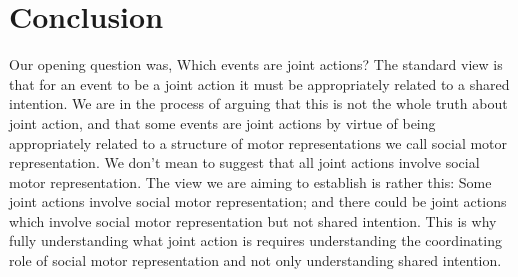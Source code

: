 \documentclass[12pt,\papersize]{extarticle}
\begin{document}
\section{Conclusion}
Our opening question was, Which events are joint actions?
The standard view is that for an event to be a joint action it must be appropriately related to a shared intention.
We are in the process of arguing that this is not the whole truth about joint action,
and that some events are joint actions by virtue of being appropriately related to a structure of motor representations we call social motor representation.
We don’t mean to suggest that all joint actions involve social motor representation.
The view we are aiming to establish is rather this: Some joint actions involve social motor representation; and there could be joint actions which involve social motor representation but not shared intention.
This is why 
fully understanding what joint action is requires understanding the coordinating role of social motor representation and not only understanding shared intention.




\end{document}

